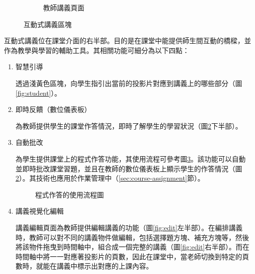\begin{figure}[H]
\begin{subfigure}{0.5\linewidth}
    \caption{教師講義頁面}
    \label{fig:teacher}
  \end{subfigure}
  \caption{互動式講義區塊}
\end{figure}

互動式講義位在課堂介面的右半部。目的是在課堂中能提供師生間互動的橋樑，並作為教學與學習的輔助工具。其相關功能可細分為以下四點：

\begin{enumerate}
  \setlength{\parindent}{2em}

  \item 智慧引導
  \par 透過淺黃色區塊，向學生指引出當前的投影片對應到講義上的哪些部分（圖\ref{fig:student}）。
  
  \item 即時反饋（數位儀表板）
  \par 為教師提供學生的課堂作答情況，即時了解學生的學習狀況（圖\ref{fig:teacher}下半部）。

  \item 自動批改
  \par 為學生提供課堂上的程式作答功能，其使用流程可參考圖\ref{fig:problem-flowchart}。該功能可以自動並即時批改課堂習題，並且在教師的數位儀表板上顯示學生的作答情況（圖\ref{fig:teacher}）。其技術也應用於作業管理中（\ref{sec:course-assignment}節）。
  
  \begin{figure}[H]
    \centering
    \caption{程式作答的使用流程圖}
    \label{fig:problem-flowchart}
  \end{figure}

  \item 講義視覺化編輯
  \par 講義編輯頁面為教師提供編輯講義的功能（圖\ref{fig:edit}左半部）。在編排講義時，教師可以對不同的講義物件做編輯，包括選擇題方塊、補充方塊等，然後將該物件拖曳到時間軸中，組合成一個完整的講義（圖\ref{fig:edit}右半部）。而在時間軸中將一一對應著投影片的頁數，因此在課堂中，當老師切換到特定的頁數時，就能在講義中標示出對應的上課內容。


\end{enumerate}
